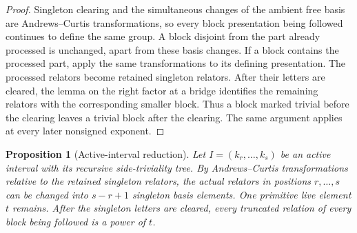 \documentclass{article}
\newtheorem{prop}[theorem]{Proposition}
\begin{document}
\begin{proof}
Singleton clearing and the simultaneous changes of the ambient free basis
are Andrews--Curtis transformations, so every block presentation being
followed continues to define the same group.  A block disjoint from the part
already processed is unchanged, apart from these basis changes.  If a block
contains the processed part, apply the same transformations to its defining
presentation.  The processed relators become retained singleton relators.
After their letters are cleared, the lemma on the right factor at a bridge
identifies the remaining relators with the corresponding smaller block.
Thus a block marked trivial before the clearing leaves a trivial block after
the clearing.  The same argument applies at every later nonsigned exponent.
\end{proof}

\begin{prop}[Active-interval reduction]
\label{prop:open-algebraic-active-interval-reduction}
Let $I=(k_r,\ldots,k_s)$ be an active interval with its recursive
side-triviality tree.  By Andrews--Curtis transformations relative to the
retained singleton relators, the actual relators in positions
$r,\ldots,s$ can be changed into $s-r+1$ singleton basis elements.  One
primitive live element $t$ remains.  After the singleton letters are
cleared, every truncated relation of every block being followed is a power
of $t$.
\end{prop}
\end{document}
